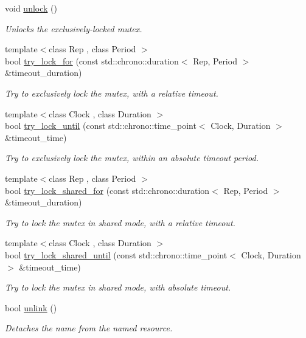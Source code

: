 \begin{DoxyCompactItemize}
void \hyperlink{classcpen333_1_1process_1_1impl_1_1shared__mutex__fair_a52f1959d5dfe0c08b911e0c4b06ce61c}{unlock} ()
\begin{DoxyCompactList}\small\item\em Unlocks the exclusively-\/locked mutex. \end{DoxyCompactList}\item 
{\footnotesize template$<$class Rep , class Period $>$ }\\bool \hyperlink{classcpen333_1_1process_1_1impl_1_1shared__mutex__fair_a949f9ed2c12c14bd2cade7ec96dd3adb}{try\+\_\+lock\+\_\+for} (const std\+::chrono\+::duration$<$ Rep, Period $>$ \&timeout\+\_\+duration)
\begin{DoxyCompactList}\small\item\em Try to exclusively lock the mutex, with a relative timeout. \end{DoxyCompactList}\item 
{\footnotesize template$<$class Clock , class Duration $>$ }\\bool \hyperlink{classcpen333_1_1process_1_1impl_1_1shared__mutex__fair_ab8acef917db5784868e439a26a72343b}{try\+\_\+lock\+\_\+until} (const std\+::chrono\+::time\+\_\+point$<$ Clock, Duration $>$ \&timeout\+\_\+time)
\begin{DoxyCompactList}\small\item\em Try to exclusively lock the mutex, within an absolute timeout period. \end{DoxyCompactList}\item 
{\footnotesize template$<$class Rep , class Period $>$ }\\bool \hyperlink{classcpen333_1_1process_1_1impl_1_1shared__mutex__fair_a0927a5897a261f5eb992eb442145fdf5}{try\+\_\+lock\+\_\+shared\+\_\+for} (const std\+::chrono\+::duration$<$ Rep, Period $>$ \&timeout\+\_\+duration)
\begin{DoxyCompactList}\small\item\em Try to lock the mutex in shared mode, with a relative timeout. \end{DoxyCompactList}\item 
{\footnotesize template$<$class Clock , class Duration $>$ }\\bool \hyperlink{classcpen333_1_1process_1_1impl_1_1shared__mutex__fair_af45bf5f8271a18b7cf3e737288d38025}{try\+\_\+lock\+\_\+shared\+\_\+until} (const std\+::chrono\+::time\+\_\+point$<$ Clock, Duration $>$ \&timeout\+\_\+time)
\begin{DoxyCompactList}\small\item\em Try to lock the mutex in shared mode, with absolute timeout. \end{DoxyCompactList}\item 
bool \hyperlink{classcpen333_1_1process_1_1impl_1_1shared__mutex__fair_a40e20137e0c27f4a742ab6c5388eb61b}{unlink} ()
\begin{DoxyCompactList}\small\item\em Detaches the name from the named resource. \end{DoxyCompactList}\end{DoxyCompactItemize}
